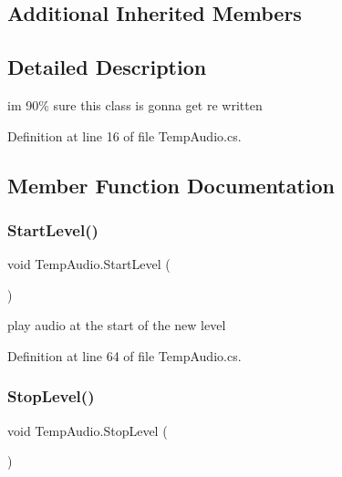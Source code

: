 \subsection*{Additional Inherited Members}


\subsection{Detailed Description}
im 90\% sure this class is gonna get re written 



Definition at line 16 of file Temp\+Audio.\+cs.



\subsection{Member Function Documentation}
\mbox{\label{class_temp_audio_a83795f0b3f58474686c4ba134e485514}} 
\subsubsection{\texorpdfstring{Start\+Level()}{StartLevel()}}
{\footnotesize\ttfamily void Temp\+Audio.\+Start\+Level (\begin{DoxyParamCaption}{ }\end{DoxyParamCaption})}



play audio at the start of the new level 



Definition at line 64 of file Temp\+Audio.\+cs.

\mbox{\label{class_temp_audio_ac57e919c76d84e8fbd11ecbaed14d63d}} 
\subsubsection{\texorpdfstring{Stop\+Level()}{StopLevel()}}
{\footnotesize\ttfamily void Temp\+Audio.\+Stop\+Level (\begin{DoxyParamCaption}{ }\end{DoxyParamCaption})}



